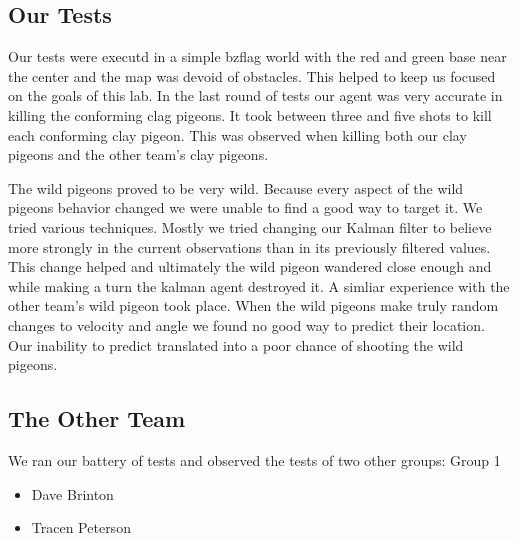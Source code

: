 \subsection{Our Tests}
Our tests were executd in a simple bzflag world with the red and green base near the center and the map was devoid of obstacles.  This helped to keep us focused on the goals of this lab.  In the last round of tests our agent was very accurate in killing the conforming clag pigeons.  It took between three and five shots to kill each conforming clay pigeon.  This was observed when killing both our clay pigeons and the other team's clay pigeons.
\par
The wild pigeons proved to be very wild.  Because every aspect of the wild pigeons behavior changed we were unable to find a good way to target it.  We tried various techniques.  Mostly we tried changing our Kalman filter to believe more strongly in the current observations than in its previously filtered values.  This change helped and ultimately the wild pigeon wandered close enough and while making a turn the kalman agent destroyed it.  A simliar experience with the other team's wild pigeon took place.  When the wild pigeons make truly random changes to velocity and angle we found no good way to predict their location.  Our inability to predict translated into a poor chance of shooting the wild pigeons.
\subsection{The Other Team}
We ran our battery of tests and observed the tests of two other groups:
Group 1
\begin{itemize}
    \item{Dave Brinton}
    \item{Tracen Peterson}
\end{itemize}

